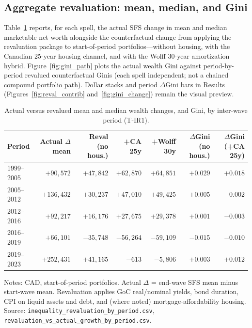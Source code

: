 \documentclass[11pt]{article}
\begin{document}
\subsection{Aggregate revaluation: mean, median, and Gini}

Table~\ref{tab:ir1} reports, for each spell, the actual SFS change in mean and median marketable net worth alongside the counterfactual change from applying the revaluation package to start-of-period portfolios---without housing, with the Canadian 25-year housing channel, and with the Wolff 30-year amortization hybrid. Figure~\ref{fig:gini_path} plots the actual wealth Gini against period-by-period revalued counterfactual Ginis (each spell independent; not a chained compound portfolio path). Dollar stacks and period $\Delta$Gini bars in Results (Figures~\ref{fig:reval_contrib} and~\ref{fig:gini_change}) remain the visual preview.

\begin{table}[ht]
\centering
\caption{Actual versus revalued mean and median wealth changes, and Gini, by inter-wave period (T-IR1).}
\label{tab:ir1}
\small
\begin{tabular}{lrrrrrr}
\toprule
Period & Actual $\Delta$ mean & Reval (no hous.) & +CA 25y & +Wolff 30y & $\Delta$Gini (no hous.) & $\Delta$Gini (+CA 25y) \\
\midrule
1999--2005 & $+90{,}572$ & $+47{,}842$ & $+62{,}870$ & $+64{,}851$ & $+0.029$ & $+0.018$ \\
2005--2012 & $+136{,}432$ & $+30{,}237$ & $+47{,}010$ & $+49{,}425$ & $+0.005$ & $-0.002$ \\
2012--2016 & $+92{,}217$ & $+16{,}176$ & $+27{,}675$ & $+29{,}378$ & $+0.001$ & $-0.003$ \\
2016--2019 & $+66{,}101$ & $-35{,}748$ & $-56{,}264$ & $-59{,}109$ & $-0.015$ & $-0.010$ \\
2019--2023 & $+252{,}431$ & $+41{,}165$ & $-613$ & $-5{,}806$ & $+0.003$ & $+0.012$ \\
\bottomrule
\end{tabular}
\par\smallskip
\begin{minipage}{0.95\textwidth}
\footnotesize Notes: CAD, start-of-period portfolios. Actual $\Delta$ = end-wave SFS mean minus start-wave mean. Revaluation applies GoC real/nominal yields, bond duration, CPI on liquid assets and debt, and (where noted) mortgage-affordability housing. Source: \texttt{inequality\_revaluation\_by\_period.csv}, \texttt{revaluation\_vs\_actual\_growth\_by\_period.csv}.
\end{minipage}
\end{table}
\end{document}
